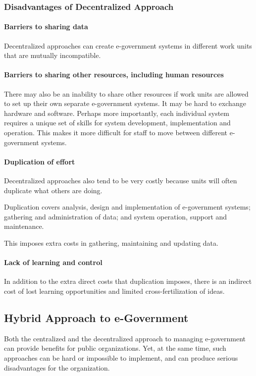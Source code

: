 \subsubsection{Disadvantages of Decentralized Approach}
\paragraph*{Barriers to sharing data}

Decentralized approaches can create e-government systems in different work units that are mutually incompatible.

\paragraph*{Barriers to sharing other resources, including human resources}
There may also be an inability to share
other resources if work units are allowed to
set up their own separate e-government systems. It may be hard to exchange hardware
and software. Perhaps more importantly,
each individual system requires a unique set
of skills for system development, implementation and operation. This makes it more
difficult for staff to move between different
e-government systems.


\paragraph*{Duplication of effort}
Decentralized approaches also tend to be very costly because units will often duplicate what others are doing.

Duplication covers analysis, design and implementation of e-government systems; gathering and administration of data; and system operation,
support and maintenance.

This imposes extra costs in gathering,
maintaining and updating data.

\paragraph*{Lack of learning and control}
In addition to the extra direct costs that
duplication imposes, there is an indirect
cost of lost learning opportunities and limited
cross-fertilization of ideas.



\subsection[Hybrid Approach]{Hybrid Approach to e-Government}
Both the centralized and
the decentralized approach to managing
e-government can provide benefits for public
organizations. Yet, at the same time, such
approaches can be hard or impossible to
implement, and can produce serious disadvantages for the organization.


